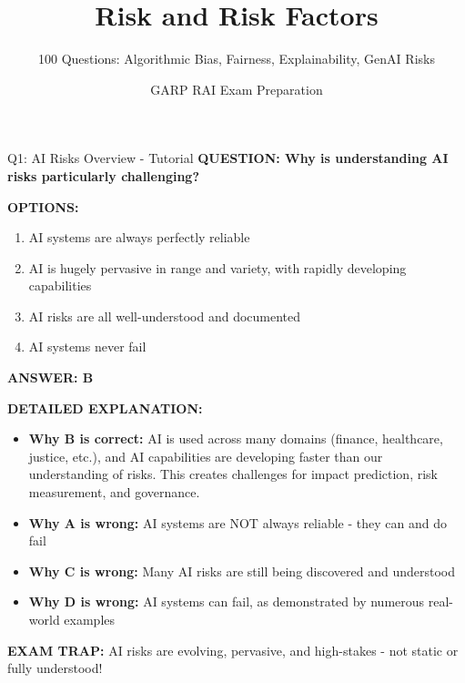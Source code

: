 \documentclass[8pt]{beamer}
\title{Risk and Risk Factors}
\subtitle{100 Questions: Algorithmic Bias, Fairness, Explainability, GenAI Risks}
\author{GARP RAI Exam Preparation}
\date{}
\begin{document}
	
	\begin{frame}
		\titlepage
	\end{frame}
	
	
	\begin{frame}{Q1: AI Risks Overview - Tutorial}
		\fontsize{6.5}{7.5}\selectfont
		\textbf{QUESTION: Why is understanding AI risks particularly challenging?}
		
		\vspace{0.1cm}
		\textbf{OPTIONS:}
		\begin{enumerate}
			\item AI systems are always perfectly reliable
			\item AI is hugely pervasive in range and variety, with rapidly developing capabilities
			\item AI risks are all well-understood and documented
			\item AI systems never fail
		\end{enumerate}
		
		\vspace{0.1cm}
		\textcolor{myblue}{\textbf{ANSWER: B}}
		
		\vspace{0.1cm}
		\textbf{DETAILED EXPLANATION:}
		\begin{itemize}
			\item \textbf{Why B is correct:} AI is used across many domains (finance, healthcare, justice, etc.), and AI capabilities are developing faster than our understanding of risks. This creates challenges for impact prediction, risk measurement, and governance.
			\item \textbf{Why A is wrong:} AI systems are NOT always reliable - they can and do fail
			\item \textbf{Why C is wrong:} Many AI risks are still being discovered and understood
			\item \textbf{Why D is wrong:} AI systems can fail, as demonstrated by numerous real-world examples
		\end{itemize}
		
		\textcolor{myred}{\textbf{EXAM TRAP:}} AI risks are \textcolor{myblue}{evolving, pervasive, and high-stakes} - not static or fully understood!
	\end{frame}
	
\end{document}
